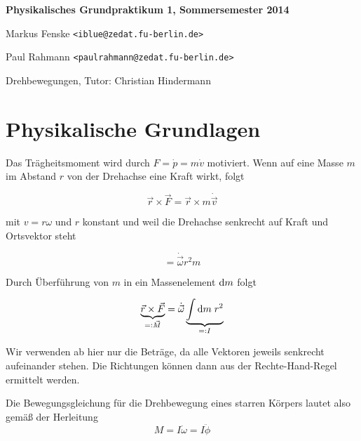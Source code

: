 \documentclass[a4paper,german,12pt,smallheadings]{scrartcl}
\begin{document}
\begin{titlepage}

\end{titlepage}

\allowdisplaybreaks %
\begin{center}
\bfseries %
\sffamily %
\vspace{-40pt}
Physikalisches Grundpraktikum 1, Sommersemester 2014

Markus Fenske \texttt{<iblue@zedat.fu-berlin.de>}

Paul Rahmann \texttt{<paulrahmann@zedat.fu-berlin.de>}

Drehbewegungen, Tutor: Christian Hindermann
\vspace{-10pt}
\end{center}

\section*{Physikalische Grundlagen}
Das Trägheitsmoment wird durch $F = \dot{p} = m \dot{v}$ motiviert. Wenn auf eine Masse $m$
im Abstand $r$ von der Drehachse eine Kraft wirkt, folgt

\begin{equation}
  \vec{r} \times \vec{F}
  = \vec{r} \times m \dot{\vec{v}}
\end{equation}

mit $v = r \omega$ und $r$ konstant und weil die Drehachse senkrecht auf Kraft
und Ortsvektor steht

\begin{equation}
  = \dot{\vec{\omega}} r^2 m
\end{equation}

Durch Überführung von $m$ in ein Massenelement $\dif m$ folgt

\begin{equation}
  \underbrace{\vec{r} \times \vec{F}}_{=: \vec{M}} = \dot{\vec{\omega}} \underbrace{\int \dif m \; r^2}_{=: I}
\end{equation}

Wir verwenden ab hier nur die Beträge, da alle Vektoren jeweils senkrecht
aufeinander stehen. Die Richtungen können dann aus der Rechte-Hand-Regel
ermittelt werden.

Die Bewegungsgleichung für die Drehbewegung eines starren Körpers lautet also gemäß der Herleitung
\begin{equation}
  M = I \dot{\omega} = I \ddot{\phi}
\end{equation}
\end{document}
